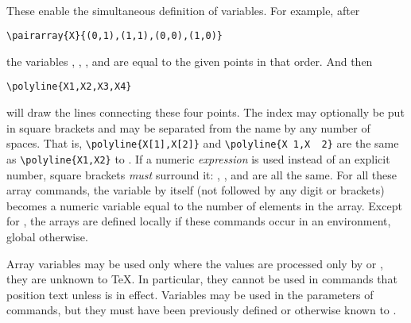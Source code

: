 \documentclass[letterpaper]{article}
\begin{document}
\begin{cd}
\\
\\
\\
\\
\\
\\
%
%
%
%
%
%
%
\end{cd}

These enable the simultaneous definition of variables.
For example, after
\begin{verbatim}
\pairarray{X}{(0,1),(1,1),(0,0),(1,0)}
\end{verbatim}
the variables , , , and  are equal to
the given points in that order. And then
\begin{verbatim}
\polyline{X1,X2,X3,X4}
\end{verbatim}
will draw the lines connecting these four points. The index may
optionally be put in square brackets and may be separated from the name
by any number of spaces. That is, \verb$\polyline{X[1],X[2]}$
and \verb$\polyline{X 1,X  2}$ are the same as \verb$\polyline{X1,X2}$
to \MF{}. If a numeric \emph{expression} is used instead of an explicit
number, square brackets \emph{must} surround it: ,
,  and  are all the same. For all these array
commands, the variable  by itself (not followed by any digit or
brackets) becomes a numeric variable equal to the number of elements in
the array. Except for , the arrays are defined
locally if these commands occur in an  environment, global
otherwise.

Array variables may be used only where the values are processed only by
\MF{} or \MP{}, they are unknown to \TeX{}. In particular, they cannot be
used in commands that position text unless  is in effect.
Variables may be used in the  parameters of commands,
but they must have been previously defined or otherwise known to \MF{}.
\end{document}
